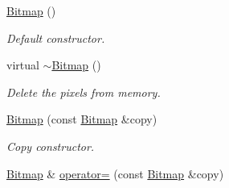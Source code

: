 \begin{DoxyCompactItemize}
\item 
\hypertarget{class_f2_c_1_1_bitmap_ac18e6a899ac76bb1fb436f10c687c8ac}{
\hyperlink{class_f2_c_1_1_bitmap_ac18e6a899ac76bb1fb436f10c687c8ac}{Bitmap} ()}
\label{class_f2_c_1_1_bitmap_ac18e6a899ac76bb1fb436f10c687c8ac}

\begin{DoxyCompactList}\small\item\em Default constructor. \item\end{DoxyCompactList}\item 
\hypertarget{class_f2_c_1_1_bitmap_adaf52fdbe54a022c38ff29d08c4cf378}{
virtual \hyperlink{class_f2_c_1_1_bitmap_adaf52fdbe54a022c38ff29d08c4cf378}{$\sim$Bitmap} ()}
\label{class_f2_c_1_1_bitmap_adaf52fdbe54a022c38ff29d08c4cf378}

\begin{DoxyCompactList}\small\item\em Delete the pixels from memory. \item\end{DoxyCompactList}\item 
\hypertarget{class_f2_c_1_1_bitmap_aee12ee2811fa7b91cc0319b726ac0561}{
\hyperlink{class_f2_c_1_1_bitmap_aee12ee2811fa7b91cc0319b726ac0561}{Bitmap} (const \hyperlink{class_f2_c_1_1_bitmap}{Bitmap} \&copy)}
\label{class_f2_c_1_1_bitmap_aee12ee2811fa7b91cc0319b726ac0561}

\begin{DoxyCompactList}\small\item\em Copy constructor. \item\end{DoxyCompactList}\item 
\hypertarget{class_f2_c_1_1_bitmap_a131077faaedc8f4893e461137f4e7a5b}{
\hyperlink{class_f2_c_1_1_bitmap}{Bitmap} \& \hyperlink{class_f2_c_1_1_bitmap_a131077faaedc8f4893e461137f4e7a5b}{operator=} (const \hyperlink{class_f2_c_1_1_bitmap}{Bitmap} \&copy)}
\label{class_f2_c_1_1_bitmap_a131077faaedc8f4893e461137f4e7a5b}


\end{DoxyCompactItemize}
